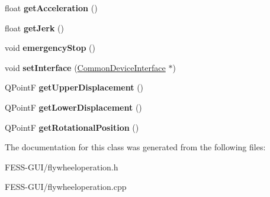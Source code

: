 \begin{DoxyCompactItemize}
float {\bfseries get\+Acceleration} ()
\item 
\hypertarget{class_flywheel_operation_ad443ef22229c1584da213f50234720bf}{}\label{class_flywheel_operation_ad443ef22229c1584da213f50234720bf} 
float {\bfseries get\+Jerk} ()
\item 
\hypertarget{class_flywheel_operation_a6a393e52299f7a48950f019d0f3db7de}{}\label{class_flywheel_operation_a6a393e52299f7a48950f019d0f3db7de} 
void {\bfseries emergency\+Stop} ()
\item 
\hypertarget{class_flywheel_operation_ab655d2757d24dbb605a8eb0c16bc0fe8}{}\label{class_flywheel_operation_ab655d2757d24dbb605a8eb0c16bc0fe8} 
void {\bfseries set\+Interface} (\hyperlink{class_common_device_interface}{Common\+Device\+Interface} $\ast$)
\item 
\hypertarget{class_flywheel_operation_a16ebc2fe8c3297350eaf9be2114a75c8}{}\label{class_flywheel_operation_a16ebc2fe8c3297350eaf9be2114a75c8} 
Q\+PointF {\bfseries get\+Upper\+Displacement} ()
\item 
\hypertarget{class_flywheel_operation_a2b9d24d0fbbf1d9cb79bb0aa54f6f6ae}{}\label{class_flywheel_operation_a2b9d24d0fbbf1d9cb79bb0aa54f6f6ae} 
Q\+PointF {\bfseries get\+Lower\+Displacement} ()
\item 
\hypertarget{class_flywheel_operation_a0e1ba213763760cf0128dfdc8436cfdf}{}\label{class_flywheel_operation_a0e1ba213763760cf0128dfdc8436cfdf} 
Q\+PointF {\bfseries get\+Rotational\+Position} ()
\end{DoxyCompactItemize}


The documentation for this class was generated from the following files\+:\begin{DoxyCompactItemize}
\item 
F\+E\+S\+S-\/\+G\+U\+I/flywheeloperation.\+h\item 
F\+E\+S\+S-\/\+G\+U\+I/flywheeloperation.\+cpp\end{DoxyCompactItemize}
